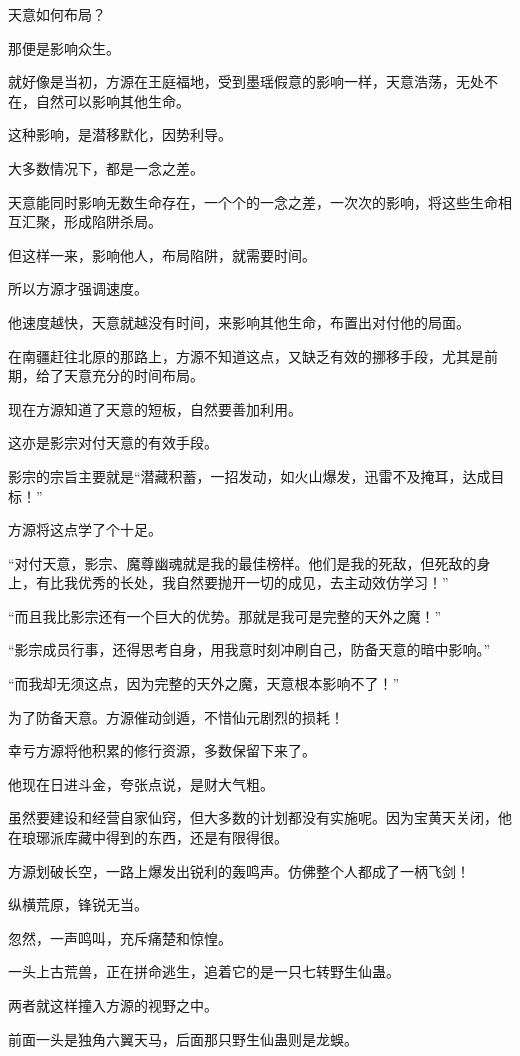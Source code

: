 \begin{this_body}
天意如何布局？

那便是影响众生。

就好像是当初，方源在王庭福地，受到墨瑶假意的影响一样，天意浩荡，无处不在，自然可以影响其他生命。

这种影响，是潜移默化，因势利导。

大多数情况下，都是一念之差。

天意能同时影响无数生命存在，一个个的一念之差，一次次的影响，将这些生命相互汇聚，形成陷阱杀局。

但这样一来，影响他人，布局陷阱，就需要时间。

所以方源才强调速度。

他速度越快，天意就越没有时间，来影响其他生命，布置出对付他的局面。

在南疆赶往北原的那路上，方源不知道这点，又缺乏有效的挪移手段，尤其是前期，给了天意充分的时间布局。

现在方源知道了天意的短板，自然要善加利用。

这亦是影宗对付天意的有效手段。

影宗的宗旨主要就是“潜藏积蓄，一招发动，如火山爆发，迅雷不及掩耳，达成目标！”

方源将这点学了个十足。

“对付天意，影宗、魔尊幽魂就是我的最佳榜样。他们是我的死敌，但死敌的身上，有比我优秀的长处，我自然要抛开一切的成见，去主动效仿学习！”

“而且我比影宗还有一个巨大的优势。那就是我可是完整的天外之魔！”

“影宗成员行事，还得思考自身，用我意时刻冲刷自己，防备天意的暗中影响。”

“而我却无须这点，因为完整的天外之魔，天意根本影响不了！”

为了防备天意。方源催动剑遁，不惜仙元剧烈的损耗！

幸亏方源将他积累的修行资源，多数保留下来了。

他现在日进斗金，夸张点说，是财大气粗。

虽然要建设和经营自家仙窍，但大多数的计划都没有实施呢。因为宝黄天关闭，他在琅琊派库藏中得到的东西，还是有限得很。

方源划破长空，一路上爆发出锐利的轰鸣声。仿佛整个人都成了一柄飞剑！

纵横荒原，锋锐无当。

忽然，一声鸣叫，充斥痛楚和惊惶。

一头上古荒兽，正在拼命逃生，追着它的是一只七转野生仙蛊。

两者就这样撞入方源的视野之中。

前面一头是独角六翼天马，后面那只野生仙蛊则是龙蜈。


\end{this_body}
